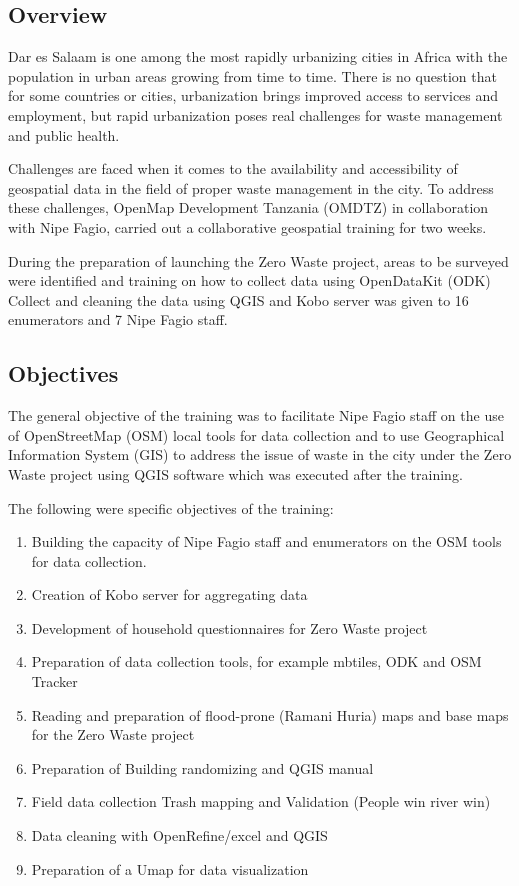 \documentclass[a4paper,12pt,twoside]{article}
\begin{document}
\subsection{Overview}

    \begin{multicols}{2}
    Dar es Salaam is one among the most rapidly urbanizing cities in Africa with the population in urban areas growing from time to time. There is no question that for some countries or cities, urbanization brings improved access to services and employment, but rapid urbanization poses real challenges for waste management and public health.
    
    Challenges are faced when it comes to the availability and accessibility of geospatial data in the field of proper waste management in the city. To address these challenges, OpenMap Development Tanzania (OMDTZ) in collaboration with Nipe Fagio, carried out a collaborative geospatial training for two weeks. 
    
    During the preparation of launching the Zero Waste project, areas to be surveyed were identified and training on how to collect data using OpenDataKit (ODK) Collect and cleaning the data using QGIS and Kobo server was given to 16 enumerators and 7 Nipe Fagio staff. 
    \end{multicols}

\subsection{Objectives}
    The general objective of the training was to facilitate Nipe Fagio staff on the use of OpenStreetMap (OSM) local tools for data collection and to use Geographical Information System (GIS) to address the issue of waste in the city under the Zero Waste project using QGIS software which was executed after the training.
    
    The following were specific objectives of the training:
        
        \begin{enumerate} %
            \item Building the capacity of Nipe Fagio staff and enumerators on the OSM tools for data collection.
            \item Creation of Kobo server for aggregating data
            \item Development of household questionnaires for Zero Waste project
            \item Preparation of data collection tools, for example mbtiles, ODK and OSM Tracker 
            \item Reading and preparation of flood-prone (Ramani Huria) maps and base maps for the Zero Waste project
            \item Preparation of Building randomizing and QGIS manual
            \item Field data collection Trash mapping and Validation (People win river win)
            \item Data cleaning with OpenRefine/excel and QGIS
            \item Preparation of a Umap for data visualization
        \end{enumerate}
\end{document}
